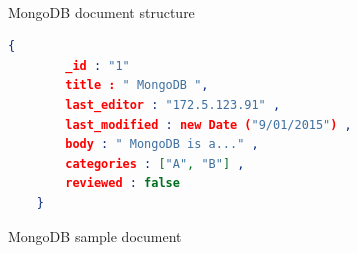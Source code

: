 \begin{figure}[h]
	\centering
	\\
	\centering
	\caption{MongoDB document structure~\citep{mongodb:org}}
	\label{fig:mongodb-doc}
	
\end{figure}

	\begin{figure}[h]
	\begin{lstlisting}[language=JSON,basicstyle=\scriptsize]
	{
		_id : "1"
		title : " MongoDB ",
		last_editor : "172.5.123.91" ,
		last_modified : new Date ("9/01/2015") ,
		body : " MongoDB is a..." ,
		categories : ["A", "B"] ,
		reviewed : false
	}
	\end{lstlisting} 
	\caption{MongoDB sample document}
	\label{sample-mongodb-document}
\end{figure}

